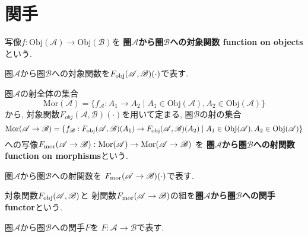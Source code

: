 \section{関手}
\begin{Def}
写像$f:\mathrm{Obj}(\mathscr{A})\rightarrow\mathrm{Obj}(\mathscr{B})$を
{\bf 圏$\mathscr{A}$から圏$\mathscr{B}$への対象関数 function on objects}という.
\end{Def}
\begin{Notation}
圏$\mathscr{A}$から圏$\mathscr{B}$への対象関数を$F_{\rm obj}(\mathscr{A},\mathscr{B})(\cdot)$で表す.
\end{Notation}
\begin{Def}
圏$\mathscr{A}$の射全体の集合\[\mathrm{Mor}(\mathscr{A})=\{f_{\mathscr{A}}:A_1\rightarrow A_2\mid A_1\in\mathrm{Obj}(\mathscr{A}),A_2\in\mathrm{Obj}(\mathscr{A})\}\]
から, 対象関数$F_{obj}(\mathscr{A},\mathscr{B})(\cdot)$を用いて定まる, 圏$\mathscr{B}$の射の集合
\[
\mathrm{Mor}(\mathscr{A}\rightarrow\mathscr{B})=\{f_{\mathscr{B}}:F_{\rm obj}(\mathscr{A},\mathscr{B})(A_1)\rightarrow
F_{\rm obj}(\mathscr{A},\mathscr{B})(A_2)\mid A_1\in\mathrm{Obj}(\mathscr{A}),A_2\in\mathrm{Obj}(\mathscr{A})\}
\]
への写像$F_{\rm mor}(\mathscr{A}\rightarrow\mathscr{B}):\mathrm{Mor}(\mathscr{A})\rightarrow\mathrm{Mor}(\mathscr{A}\rightarrow\mathscr{B})$
を
{\bf 圏$\mathscr{A}$から圏$\mathscr{B}$への射関数 function on morphisms}という.
\end{Def}
\begin{Notation}
圏$\mathscr{A}$から圏$\mathscr{B}$への射関数を
$F_{\rm mor}(\mathscr{A}\rightarrow\mathscr{B})(\cdot)$で表す.
\end{Notation}
\begin{Def}
対象関数$F_{\rm obj}(\mathscr{A},\mathscr{B})$と
射関数$F_{\rm mor}(\mathscr{A}\rightarrow\mathscr{B})$の組を{\bf 圏$\mathscr{A}$から圏$\mathscr{B}$への関手 functor}という.
\end{Def}
\begin{Notation}
圏$\mathscr{A}$から圏$\mathscr{B}$への関手$F$を
$F:\mathscr{A}\rightarrow\mathscr{B}$で表す.
\end{Notation}
\begin{comment}
\begin{example}
順序を保存する写像
\end{example}
\end{comment}
\begin{comment}
\begin{example}
圏と見做した順序集合間の簡単な関手の例
\end{example}
\end{comment}
\begin{comment}
*************************
\begin{example}
$n$次ホモロジー関手
\end{example}
***************************
\end{comment}

